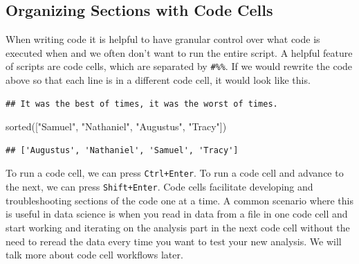 \documentclass[]{Nemilov}
\newenvironment{Shaded}{\begin{snugshade}}{\end{snugshade}}
\newcommand{\BuiltInTok}[1]{#1}
\newcommand{\CommentTok}[1]{\textcolor[rgb]{0.56,0.35,0.01}{\textit{#1}}}
\newcommand{\NormalTok}[1]{#1}
\newcommand{\StringTok}[1]{\textcolor[rgb]{0.31,0.60,0.02}{#1}}
\begin{document}
\hypertarget{organizing-sections-with-code-cells}{%
\subsection{Organizing Sections with Code Cells}\label{organizing-sections-with-code-cells}}

When writing code it is helpful to have granular control over what code is
executed when and we often don't want to run the entire script. A helpful
feature of scripts are code cells, which are separated by \texttt{\#\%\%}. If we would
rewrite the code above so that each line is in a different code cell, it would
look like this.

\begin{Shaded}
\end{Shaded}

\begin{verbatim}
## It was the best of times, it was the worst of times.
\end{verbatim}

\begin{Shaded}
\begin{Highlighting}[]
\BuiltInTok{sorted}\NormalTok{([}\StringTok{"Samuel"}\NormalTok{, }\StringTok{"Nathaniel"}\NormalTok{, }\StringTok{"Augustus"}\NormalTok{, }\StringTok{"Tracy"}\NormalTok{])}
\end{Highlighting}
\end{Shaded}

\begin{verbatim}
## ['Augustus', 'Nathaniel', 'Samuel', 'Tracy']
\end{verbatim}

To run a code cell, we can press \texttt{Ctrl+Enter}. To run a code cell and advance
to the next, we can press \texttt{Shift+Enter}. Code cells facilitate developing and
troubleshooting sections of the code one at a time. A common scenario where
this is useful in data science is when you read in data from a file in one code
cell and start working and iterating on the analysis part in the next code cell
without the need to reread the data every time you want to test your new
analysis. We will talk more about code cell workflows later.
\end{document}
